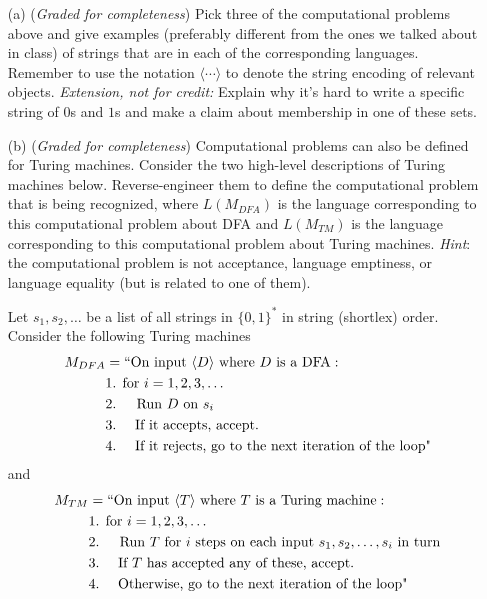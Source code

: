 \documentclass[12pt, oneside]{article}
\newcommand{\gradeComplete}{({\it Graded for completeness}) }
\begin{document}
\begin{enumerate}[wide, labelwidth=!, labelindent=0pt]
\begin{enumerate}
    \item[(a)] \gradeComplete Pick three of the computational problems above and give 
    examples (preferably different from the ones we talked about in class) of strings that are
    in each of the corresponding languages. Remember to use the 
    notation $\langle \cdots \rangle$ to denote the string encoding of relevant objects.
    {\it Extension, not for credit:} Explain why it's hard to write a specific string of 
    $0$s and $1$s and make a claim about membership in one of these sets.
    \item[(b)] \gradeComplete Computational problems can also be defined for Turing machines.
    Consider the two high-level descriptions of Turing machines below.
    Reverse-engineer them to define the computational problem that is being
    recognized, where $L(M_{DFA})$ is the language corresponding to this computational
    problem about DFA and $L(M_{TM})$ is the language corresponding to this computational
    problem about Turing machines. {\it Hint}: the computational problem is not acceptance,
    language emptiness, or language equality (but is related to one of them).

    Let $s_1, s_2, \ldots$ be a list of all strings in 
    $\{0,1\}^*$ in string (shortlex) order. Consider the following Turing machines
    \begin{align*}
        M_{DFA} &= ``\text{On input $\langle D \rangle$ where $D$ is a DFA}:\\
         &\text{1. for $i=1, 2, 3, \ldots$} \\
         &\text{2.~~~ Run $D$ on $s_i$} \\
         &\text{3.~~~~If it accepts, accept.}\\
         &\text{4.~~~~If it rejects, go to the next iteration of the loop"}\\
     \end{align*}
     and
     \begin{align*}
        M_{TM} &= ``\text{On input $\langle T \rangle$ where $T$ is a Turing machine}:\\
         &\text{1. for $i=1, 2, 3, \ldots$} \\
         &\text{2.~~~ Run $T$ for $i$ steps on each input $s_1, s_2, \ldots, s_i$ in turn} \\
         &\text{3.~~~~If $T$ has accepted any of these, accept.}\\
         &\text{4.~~~~Otherwise, go to the next iteration of the loop"}\\
     \end{align*}
\end{enumerate}



\end{enumerate}
\end{document}
